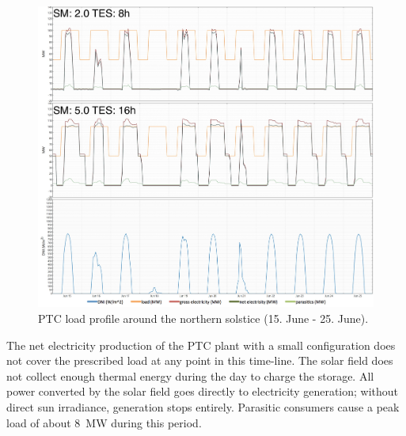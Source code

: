 \begin{figure}[htbp]  
\centering
\includegraphics[width=1\linewidth]{FIG/PTC_winter_load}
\caption[PTC load profile around the northern solstice.]{PTC load profile around the northern solstice (15. June - 25. June).}\label{PTC_winter_load}
\end{figure}

The net electricity production of the PTC plant with a small configuration does not cover the prescribed load at any point in this time-line. The solar field does not collect enough thermal energy during the day to charge the storage. All power converted by the solar field goes directly to electricity generation; without direct sun irradiance, generation stops entirely. Parasitic consumers cause a peak load of about \SI{8}{MW} during this period.


